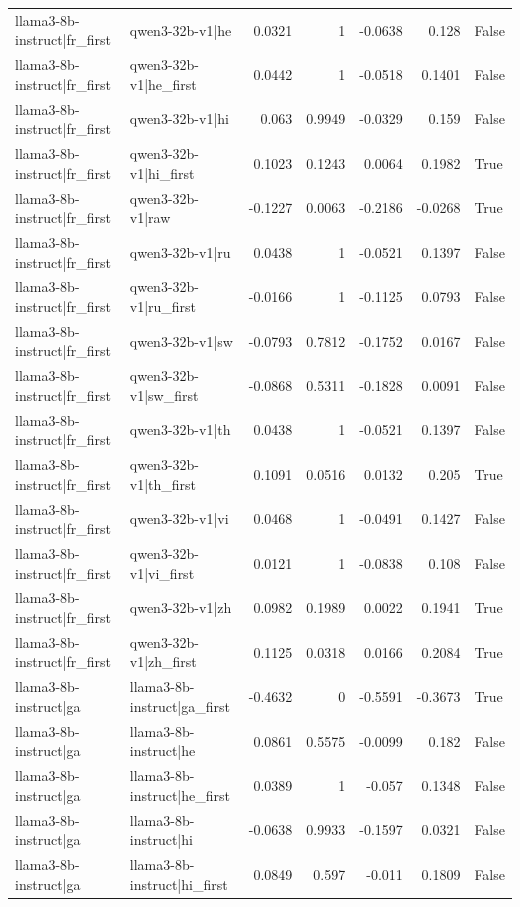 \begin{table}
\begin{tabular}{l l r r r r l}
llama3-8b-instruct|fr_first & qwen3-32b-v1|he & 0.0321 & 1 & -0.0638 & 0.128 & False \\
llama3-8b-instruct|fr_first & qwen3-32b-v1|he_first & 0.0442 & 1 & -0.0518 & 0.1401 & False \\
llama3-8b-instruct|fr_first & qwen3-32b-v1|hi & 0.063 & 0.9949 & -0.0329 & 0.159 & False \\
llama3-8b-instruct|fr_first & qwen3-32b-v1|hi_first & 0.1023 & 0.1243 & 0.0064 & 0.1982 & True \\
llama3-8b-instruct|fr_first & qwen3-32b-v1|raw & -0.1227 & 0.0063 & -0.2186 & -0.0268 & True \\
llama3-8b-instruct|fr_first & qwen3-32b-v1|ru & 0.0438 & 1 & -0.0521 & 0.1397 & False \\
llama3-8b-instruct|fr_first & qwen3-32b-v1|ru_first & -0.0166 & 1 & -0.1125 & 0.0793 & False \\
llama3-8b-instruct|fr_first & qwen3-32b-v1|sw & -0.0793 & 0.7812 & -0.1752 & 0.0167 & False \\
llama3-8b-instruct|fr_first & qwen3-32b-v1|sw_first & -0.0868 & 0.5311 & -0.1828 & 0.0091 & False \\
llama3-8b-instruct|fr_first & qwen3-32b-v1|th & 0.0438 & 1 & -0.0521 & 0.1397 & False \\
llama3-8b-instruct|fr_first & qwen3-32b-v1|th_first & 0.1091 & 0.0516 & 0.0132 & 0.205 & True \\
llama3-8b-instruct|fr_first & qwen3-32b-v1|vi & 0.0468 & 1 & -0.0491 & 0.1427 & False \\
llama3-8b-instruct|fr_first & qwen3-32b-v1|vi_first & 0.0121 & 1 & -0.0838 & 0.108 & False \\
llama3-8b-instruct|fr_first & qwen3-32b-v1|zh & 0.0982 & 0.1989 & 0.0022 & 0.1941 & True \\
llama3-8b-instruct|fr_first & qwen3-32b-v1|zh_first & 0.1125 & 0.0318 & 0.0166 & 0.2084 & True \\
llama3-8b-instruct|ga & llama3-8b-instruct|ga_first & -0.4632 & 0 & -0.5591 & -0.3673 & True \\
llama3-8b-instruct|ga & llama3-8b-instruct|he & 0.0861 & 0.5575 & -0.0099 & 0.182 & False \\
llama3-8b-instruct|ga & llama3-8b-instruct|he_first & 0.0389 & 1 & -0.057 & 0.1348 & False \\
llama3-8b-instruct|ga & llama3-8b-instruct|hi & -0.0638 & 0.9933 & -0.1597 & 0.0321 & False \\
llama3-8b-instruct|ga & llama3-8b-instruct|hi_first & 0.0849 & 0.597 & -0.011 & 0.1809 & False \\

\end{tabular}
\end{table}
